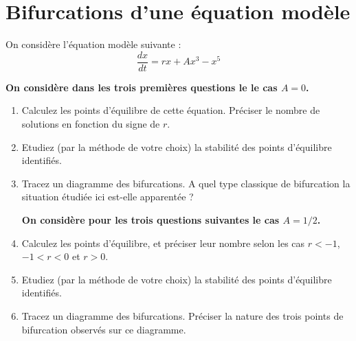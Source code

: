 \documentclass[a4paper,11pt]{article}
\begin{document}
 
 








\section{Bifurcations d'une équation modèle}

On considère l'équation modèle suivante :
$$
\frac{ d x}{dt} = r x + A x^3 - x^5
$$

{\bf On considère dans les trois premières questions le le cas $A = 0$.}

\begin{enumerate}

\item Calculez les points d'équilibre de cette équation. Préciser le nombre de solutions en fonction du signe de $r$.

\item Etudiez (par la méthode de votre choix) la stabilité des points d'équilibre identifiés.

\item Tracez un diagramme des bifurcations. A quel type classique de bifurcation la situation étudiée ici est-elle apparentée ?

{\bf On considère pour les trois questions suivantes le cas $A = 1/2$.}

\item Calculez les points d'équilibre, et préciser leur nombre selon les cas $r<-1$, $-1<r<0$ et $r>0$.

\item  Etudiez (par la méthode de votre choix) la stabilité des points d'équilibre identifiés.

\item Tracez un diagramme des bifurcations. Préciser la nature des trois points de bifurcation observés sur ce diagramme.

\end{enumerate}
\end{document}
